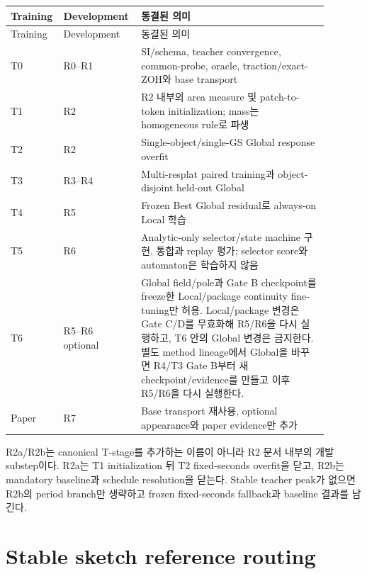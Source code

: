 \documentclass[10pt]{article}
\begin{document}
\begin{longtable}{L{0.09\linewidth}L{0.22\linewidth}L{0.58\linewidth}}
\toprule
Training & Development & 동결된 의미\\
\midrule
\endfirsthead
\toprule
Training & Development & 동결된 의미\\
\midrule
\endhead
T0 & R0--R1 &
SI/schema, teacher convergence, common-probe, oracle, traction/exact-ZOH와 base transport\\
T1 & R2 &
R2 내부의 area measure 및 patch-to-token initialization; mass는 homogeneous rule로 파생\\
T2 & R2 &
Single-object/single-GS Global response overfit\\
T3 & R3--R4 &
Multi-resplat paired training과 object-disjoint held-out Global\\
T4 & R5 &
Frozen Best Global residual로 always-on Local 학습\\
T5 & R6 &
Analytic-only selector/state machine 구현, 통합과 replay 평가; selector score와 automaton은 학습하지 않음\\
T6 & R5--R6 optional &
Global field/pole과 Gate B checkpoint를 freeze한 Local/package continuity fine-tuning만 허용.
Local/package 변경은 Gate C/D를 무효화해 R5/R6을 다시 실행하고,
T6 안의 Global 변경은 금지한다. 별도 method lineage에서 Global을 바꾸면 R4/T3 Gate B부터
새 checkpoint/evidence를 만들고 이후 R5/R6을 다시 실행한다.\\
Paper & R7 &
Base transport 재사용, optional appearance와 paper evidence만 추가\\
\bottomrule
\end{longtable}

R2a/R2b는 canonical T-stage를 추가하는 이름이 아니라 R2 문서 내부의 개발 substep이다.
R2a는 T1 initialization 뒤 T2 fixed-seconds overfit을 닫고, R2b는 mandatory baseline과
schedule resolution을 닫는다. Stable teacher peak가 없으면 R2b의 period branch만 생략하고
frozen fixed-seconds fallback과 baseline 결과를 남긴다.

\section{Stable sketch reference routing}
\end{document}
